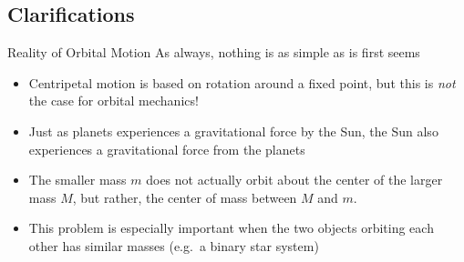 \documentclass[12pt,compress,aspectratio=169]{beamer}
\newcommand{\eq}[2]{\vspace{#1}{\Large\begin{displaymath}#2\end{displaymath}}}
\begin{document}



\subsection{Clarifications}

\begin{frame}{Reality of Orbital Motion}
  As always, nothing is as simple as is first seems
  \begin{itemize}
  \item Centripetal motion is based on rotation around a fixed point, but this
    is \emph{not} the case for orbital mechanics!
  \item Just as planets experiences a gravitational force by the Sun, the Sun
    also experiences a gravitational force from the planets
  \item The smaller mass $m$ does not actually orbit about the center of the
    larger mass $M$, but rather, the center of mass between $M$ and $m$.
  \item This problem is especially important when the two objects orbiting each
    other has similar masses (e.g.\ a binary star system)
  \end{itemize}
\end{frame}
\end{document}
